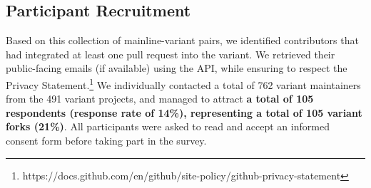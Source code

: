 

\subsection{Participant Recruitment}

Based on this collection of mainline-variant pairs, we identified contributors that had integrated at least one pull request into the variant. %
We retrieved their public-facing emails (if available) using the \gh API, while ensuring to respect the \gh Privacy Statement.\footnote{https://docs.github.com/en/github/site-policy/github-privacy-statement}
We individually contacted a total of 762 variant maintainers from the 491 variant projects, and managed to attract \textbf{a total of 105 respondents (response rate of 14\%), representing a total of 105 variant forks (21\%)}.
All participants were asked to read and accept an informed consent form before taking part in the survey.


